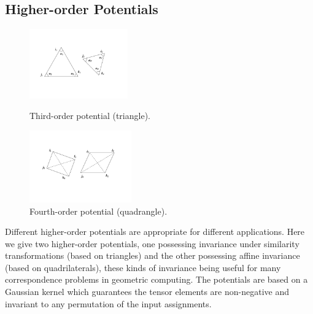 \subsection{Higher-order Potentials}
\label{subsec:potentials}

\begin{figure}[!ht]
\setlength{\abovecaptionskip}{0mm}
\setlength{\belowcaptionskip}{2mm}
 \begin{minipage}[!ht]{0.5\linewidth}
  \centering
  \includegraphics[height=30mm]{thirdorderpotentials.pdf}
  \caption{Third-order potential (triangle).}
  \label{fig:side:thirdorder}
 \end{minipage}%
 \begin{minipage}[!ht]{0.5\linewidth}
  \centering
  \includegraphics[height=31mm]{fourthorderpotentials.pdf}
  \caption{Fourth-order potential (quadrangle).}
  \label{fig:side:fourthorder}
 \end{minipage}
 \vspace{-4ex}
\end{figure}

Different higher-order potentials are appropriate for different applications.
Here we give two higher-order potentials, one possessing invariance under similarity transformations (based on triangles) and the other possessing affine invariance (based on quadrilaterals), these kinds of
invariance being useful for many correspondence problems in geometric computing.
The potentials are based on a Gaussian kernel which guarantees the tensor elements are non-negative and invariant to any permutation of the input assignments.

